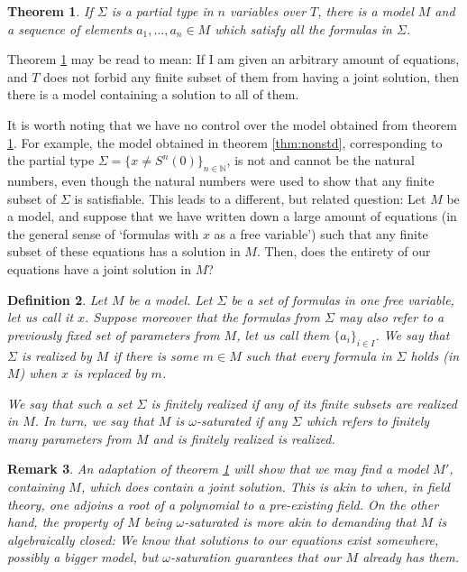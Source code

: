 \documentclass{article}
\newtheorem{theorem}{Theorem}[section]
\newtheorem{remark}[theorem]{Remark}
\newtheorem{definition}[theorem]{Definition}
\theoremstyle{nonumberplain}
\newcommand{\N}{\mathbb{N}}
\begin{document}
\begin{theorem}\label{thm:ptype}
If $\Sigma$ is a partial type in $n$ variables over $T$, there is a model $M$ and a sequence of elements $a_1, \dots, a_n \in M$ which satisfy all the formulas in $\Sigma$.
\end{theorem}

Theorem \ref{thm:ptype} may be read to mean: If I am given an arbitrary amount of equations, and $T$ does not forbid any finite subset of them from having a joint solution, then there is a model containing a solution to all of them.

It is worth noting that we have no control over the model obtained from theorem \ref{thm:ptype}. For example, the model obtained in theorem \ref{thm:nonstd}, corresponding to the partial type $\Sigma = \{x \neq S^n(0)\}_{n \in \N}$, is not and cannot be the natural numbers, even though the natural numbers were used to show that any finite subset of $\Sigma$ is satisfiable. This leads to a different, but related question: Let $M$ be a model, and suppose that we have written down a large amount of equations (in the general sense of `formulas with $x$ as a free variable') such that any finite subset of these equations has a solution in $M$. Then, does the entirety of our equations have a joint solution in $M$?

\begin{definition}
Let $M$ be a model. Let $\Sigma$ be a set of formulas in one free variable, let us call it $x$. Suppose moreover that the formulas from $\Sigma$ may also refer to a previously fixed set of parameters from $M$, let us call them $\{a_i\}_{i \in I}$. We say that $\Sigma$ is \emph{realized by $M$} if there is some $m \in M$ such that every formula in $\Sigma$ holds (in $M$) when $x$ is replaced by $m$.

We say that such a set $\Sigma$ is \emph{finitely realized} if any of its finite subsets are realized in $M$. In turn, we say that $M$ is \emph{$\omega$-saturated} if any $\Sigma$ which refers to finitely many parameters from $M$ and is finitely realized is realized.
\end{definition}

\begin{remark}
An adaptation of theorem \ref{thm:ptype} will show that we may find a model $M'$, containing $M$, which does contain a joint solution. This is akin to when, in field theory, one adjoins a root of a polynomial to a pre-existing field. On the other hand, the property of $M$ being $\omega$-saturated is more akin to demanding that $M$ is algebraically closed: We know that solutions to our equations exist \emph{somewhere}, possibly a bigger model, but $\omega$-saturation guarantees that our $M$ already has them.
\end{remark}
\end{document}
